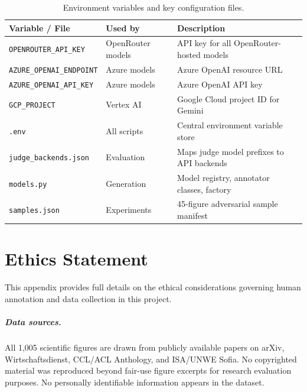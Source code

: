 \begin{table}[H]
\centering
\scriptsize
\caption{Environment variables and key configuration files.}\label{tab:config-ref}
\begin{tabular}{@{}l l p{5cm}@{}}
\toprule
\textbf{Variable / File} & \textbf{Used by} & \textbf{Description} \\
\midrule
\texttt{OPENROUTER\_API\_KEY}       & OpenRouter models & API key for all OpenRouter-hosted models \\
\texttt{AZURE\_OPENAI\_ENDPOINT}    & Azure models      & Azure OpenAI resource URL \\
\texttt{AZURE\_OPENAI\_API\_KEY}    & Azure models      & Azure OpenAI API key \\
\texttt{GCP\_PROJECT}               & Vertex AI         & Google Cloud project ID for Gemini \\
\midrule
\texttt{.env}                        & All scripts       & Central environment variable store \\
\texttt{judge\_backends.json}        & Evaluation        & Maps judge model prefixes to API backends \\
\texttt{models.py}                   & Generation        & Model registry, annotator classes, factory \\
\texttt{samples.json}                & Experiments       & 45-figure adversarial sample manifest \\
\bottomrule
\end{tabular}
\end{table}

\chapter{Ethics Statement}
\label{app:ethics-detail}

\small
This appendix provides full details on the ethical considerations governing human annotation and data collection in this project.

\paragraph{Data sources.}
All 1,005 scientific figures are drawn from publicly available papers on arXiv, Wirtschaftsdienst, CCL/ACL Anthology, and ISA/UNWE Sofia. No copyrighted material was reproduced beyond fair-use figure excerpts for research evaluation purposes. No personally identifiable information appears in the dataset.

